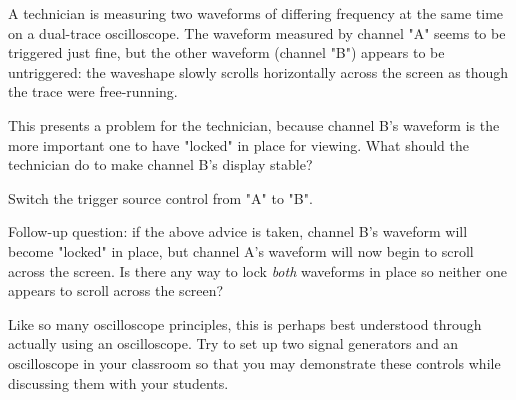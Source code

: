 

A technician is measuring two waveforms of differing frequency at the same time on a dual-trace oscilloscope.  The waveform measured by channel "A" seems to be triggered just fine, but the other waveform (channel "B") appears to be untriggered: the waveshape slowly scrolls horizontally across the screen as though the trace were free-running.

This presents a problem for the technician, because channel B's waveform is the more important one to have "locked" in place for viewing.  What should the technician do to make channel B's display stable?







Switch the trigger source control from "A" to "B".

\vskip 10pt

Follow-up question: if the above advice is taken, channel B's waveform will become "locked" in place, but channel A's waveform will now begin to scroll across the screen.  Is there any way to lock {\it both} waveforms in place so neither one appears to scroll across the screen?







Like so many oscilloscope principles, this is perhaps best understood through actually using an oscilloscope.  Try to set up two signal generators and an oscilloscope in your classroom so that you may demonstrate these controls while discussing them with your students.




